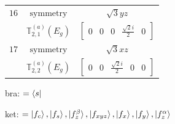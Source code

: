 \documentclass[fleqn,8pt,landscape]{jsarticle}
\begin{document}
\begin{longtable}{ccc}
$ 16 $ & $ \text{symmetry} $ & $ \sqrt{3} y z $ \\
$  $ & $ \mathbb{T}_{2,1}^{(a)}(E_{g}) $ & $ \begin{bmatrix} 0 & 0 & 0 & \frac{\sqrt{2} i}{2} & 0 \end{bmatrix} $ \\ \hline
$ 17 $ & $ \text{symmetry} $ & $ \sqrt{3} x z $ \\
$  $ & $ \mathbb{T}_{2,2}^{(a)}(E_{g}) $ & $ \begin{bmatrix} 0 & 0 & \frac{\sqrt{2} i}{2} & 0 & 0 \end{bmatrix} $ \\ \hline
\end{longtable}
bra: $=\bra{s}$

\noindent
ket: $=\ket{f_{c}}, \ket{f_{s}}, \ket{f_{z}^{\beta}}, \ket{f_{xyz}}, \ket{f_{x}}, \ket{f_{y}}, \ket{f_{z}^{\alpha}}$
\renewcommand{\arraystretch}{1.6}
\end{document}
